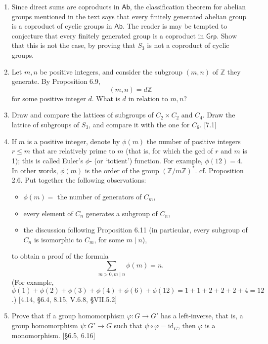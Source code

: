 \begin{enumerate}
    \item Since direct sums are coproducts in $\mathsf{Ab}$, the classification theorem for abelian groups mentioned in the text says that every finitely generated abelian group is a coproduct of cyclic groups in $\mathsf{Ab}$. The reader is may be tempted to conjecture that every finitely generated group is a coproduct in $\mathsf{Grp}$. Show that this is not the case, by proving that $S_3$ is not a coproduct of cyclic groups.

    \item Let $m, n$ be positive integers, and consider the subgroup $(m, n)$ of $\mathbb{Z}$ they generate. By Proposition 6.9,
          \[ (m, n) = d\mathbb{Z} \]
          for some positive integer $d$. What is $d$ in relation to $m, n$?

    \item Draw and compare the lattices of subgroups of $C_2 \times C_2$ and $C_4$. Draw the lattice of subgroups of $S_3$, and compare it with the one for $C_6$. [7.1]

    \item If $m$ is a positive integer, denote by $\phi(m)$ the number of positive integers $r \le m$ that are relatively prime to $m$ (that is, for which the $\text{gcd}$ of $r$ and $m$ is 1); this is called Euler's $\phi$- (or `totient') function. For example, $\phi(12)=4$. In other words, $\phi(m)$ is the order of the group $(\mathbb{Z}/m\mathbb{Z})^*$. cf. Proposition 2.6.
          Put together the following observations:
          \begin{itemize}
              \item $\phi(m) = $ the number of generators of $C_m$,
              \item every element of $C_n$ generates a subgroup of $C_n$,
              \item the discussion following Proposition 6.11 (in particular, every subgroup of $C_n$ is isomorphic to $C_m$, for some $m \mid n$),
          \end{itemize}
          to obtain a proof of the formula
          \[ \sum_{m>0, m \mid n} \phi(m) = n. \]
          (For example, $\phi(1)+\phi(2)+\phi(3)+\phi(4)+\phi(6)+\phi(12) = 1+1+2+2+2+4 = 12$.) [4.14, \S6.4, 8.15, V.6.8, \S VII.5.2]

    \item Prove that if a group homomorphism $\varphi: G \to G'$ has a left-inverse, that is, a group homomorphism $\psi: G' \to G$ such that $\psi \circ \varphi = \text{id}_G$, then $\varphi$ is a monomorphism. [\S6.5, 6.16]


\end{enumerate}

